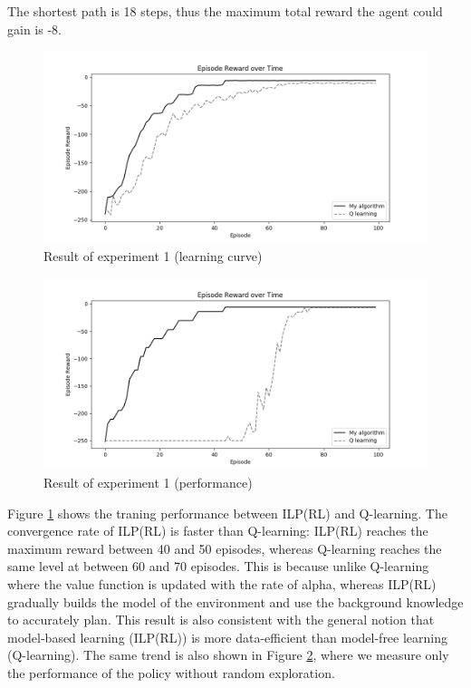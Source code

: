 The shortest path is 18 steps, thus the maximum total reward the agent could gain is -8.

\begin{figure}[!htb]
\centering
\includegraphics[width=1.0\textwidth]{./figures/experiment1_training}
\caption{Result of experiment 1 (learning curve)}
\label{experiment1_training}
\end{figure}
\begin{figure}[!htb]
\centering
\includegraphics[width=1.0\textwidth]{./figures/experiment1_test}
\caption{Result of experiment 1 (performance)}
\label{experiment1_test}
\end{figure}

Figure \ref{experiment1_training} shows the traning performance between ILP(RL) and Q-learning.
The convergence rate of ILP(RL) is faster than Q-learning: ILP(RL) reaches the maximum reward between 40 and 50 episodes, whereas Q-learning reaches the same level at between 60 and 70 episodes.
This is because unlike Q-learning where the value function is updated with the rate of alpha, whereas ILP(RL) gradually builds the model of the environment and use the background knowledge to accurately plan.
This result is also consistent with the general notion that model-based learning (ILP(RL)) is more data-efficient than model-free learning (Q-learning).
The same trend is also shown in Figure \ref{experiment1_test}, where we measure only the performance of the policy without random exploration.


